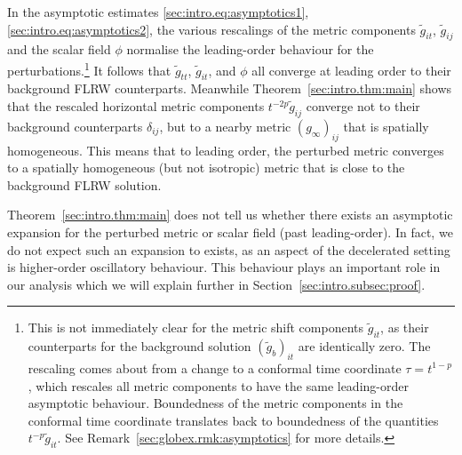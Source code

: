 \documentclass{article}
\newcommand{\wt}{\widetilde}
\begin{document}
\begin{remark}
    In the asymptotic estimates \eqref{sec:intro.eq:asymptotics1}, \eqref{sec:intro.eq:asymptotics2}, the various rescalings of the metric components $\wt{g}_{it}$, $\wt{g}_{ij}$ and the scalar field $\phi$ normalise the leading-order behaviour for the perturbations.\footnote{This is not immediately clear for the metric shift components $\wt{g}_{it}$, as their counterparts for the background solution $(\wt{g}_b)_{it}$ are identically zero. The rescaling comes about from a change to a conformal time coordinate $\tau = t^{1-p}$, which rescales all metric components to have the same leading-order asymptotic behaviour. Boundedness of the metric components in the conformal time coordinate translates back to boundedness of the quantities $t^{-p}\wt{g}_{it}$. See Remark~\ref{sec:globex.rmk:asymptotics} for more details.} It follows that $\wt{g}_{tt}$, $\wt{g}_{it}$, and $\phi$ all converge at leading order to their background FLRW counterparts. Meanwhile Theorem~\ref{sec:intro.thm:main} shows that the rescaled horizontal metric components $t^{-2p}\wt{g}_{ij}$ converge not to their background counterparts $\delta_{ij}$, but to a nearby metric $(g_\infty)_{ij}$ that is spatially homogeneous. This means that to leading order, the perturbed metric converges to a spatially homogeneous (but not isotropic) metric that is close to the background FLRW solution.
\end{remark}
\begin{remark}
    Theorem~\ref{sec:intro.thm:main} does not tell us whether there exists an asymptotic expansion for the perturbed metric or scalar field (past leading-order). In fact, we do not expect such an expansion to exists, as an aspect of the decelerated setting is higher-order oscillatory behaviour. This behaviour plays an important role in our analysis which we will explain further in Section~\ref{sec:intro.subsec:proof}.
\end{remark}
\end{document}
